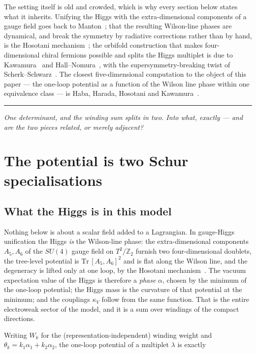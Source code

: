 \documentclass[11pt,a4paper]{article}
\newcommand{\ZZ}{\mathbb{Z}}
\newcommand{\su}[1]{SU(#1)}
\newcommand{\bridge}[1]{\par\medskip\noindent
  \textcolor{hdrblue!45}{\rule{2.2cm}{0.6pt}}\;\;\parbox[t]{0.84\textwidth}{\small\itshape
  \textcolor{hdrblue!85}{#1}}\par\medskip}
\begin{document}
The setting itself is old and crowded, which is why every section below states what it inherits.
Unifying the Higgs with the extra-dimensional components of a gauge field goes back to
Manton~\cite{Manton}; that the resulting Wilson-line phases are dynamical, and break the symmetry by
radiative corrections rather than by hand, is the Hosotani mechanism~\cite{Hosotani}; the orbifold
construction that makes four-dimensional chiral fermions possible and splits the Higgs multiplet is
due to Kawamura~\cite{Kawamura} and Hall--Nomura~\cite{HallNomura}, with the supersymmetry-breaking
twist of Scherk--Schwarz~\cite{SS}. The closest five-dimensional computation to the object of this
paper --- the one-loop potential as a function of the Wilson line phase within one equivalence class
--- is Haba, Harada, Hosotani and Kawamura~\cite{HHHK}.

\bridge{One determinant, and the winding sum splits in two. Into what, exactly --- and are the two
pieces related, or merely adjacent?}

\section{The potential is two Schur specialisations}\label{sec:two}

\subsection*{What the Higgs is in this model}

Nothing below is about a scalar field added to a Lagrangian. In gauge-Higgs unification the Higgs
\emph{is} the Wilson-line phase: the extra-dimensional components $A_5,A_6$ of the $\su4$ gauge field
on $T^2/\ZZ_2$ furnish two four-dimensional doublets, the tree-level potential is
$\mathrm{Tr}\,[A_5,A_6]^2$ and is flat along the Wilson line, and the degeneracy is lifted only at one
loop, by the Hosotani mechanism~\cite{Hosotani}. The vacuum expectation value of the Higgs is
therefore a \emph{phase} $\alpha$, chosen by the minimum of the one-loop potential; the Higgs mass is
the curvature of that potential at the minimum; and the couplings $\kappa_V$ follow from the same
function. That is the entire electroweak sector of the model, and it is a sum over windings of the
compact directions.

Writing $W_k$ for the (representation-independent) winding weight and $\theta_k=k_1\alpha_1+k_2\alpha_2$,
the one-loop potential of a multiplet $\lambda$ is exactly
\end{document}
